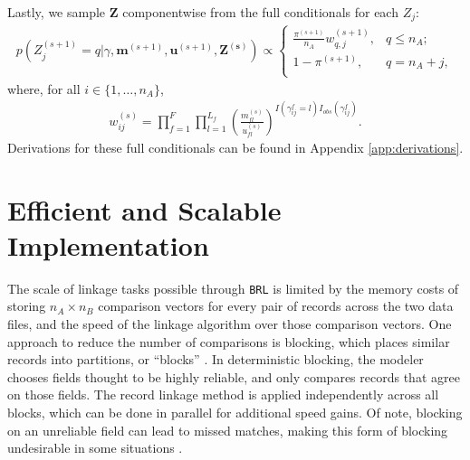 \documentclass[ba]{imsart}
\begin{document}
Lastly, we sample $\bm{Z}$ componentwise from the full conditionals for each $Z_j$:
\begin{align}
	\label{eqn:z_full_conditional}
	p\left(Z_j^{(s+1)}  = q|\gamma, \bm{m}^{(s+1)}, \bm{u}^{(s+1)}, \bm{Z^{(s)}}\right) \propto
	\begin{cases} 
		\frac{\pi^{(s+1)}}{n_A} w_{q, j}^{(s+1)},  & q \leq n_A; \\
		1 - \pi^{(s+1)}, & q  = n_A + j, \\
	\end{cases}
\end{align}
where, for all $i \in \{1, \ldots, n_A\}$, 
\begin{align}
	\label{eqn:fs_weight}
	w_{ij}^{(s)} = \prod_{f=1}^{F}\prod_{l = 1}^{L_f} \left(\frac{m_{fl}^{(s)}}{u_{fl}^{(s)}}\right)^{I(\gamma_{ij}^f = l)I_{obs}(\gamma_{ij}^f)}.
\end{align}
Derivations for these full conditionals can be found in Appendix \ref{app:derivations}.

\section{Efficient and Scalable Implementation}
\label{sec:efficiency}

The scale of linkage tasks possible through \texttt{BRL} is limited by the memory costs of storing $n_A \times n_B$ comparison vectors for every pair of records across the two data files, and the speed of the linkage algorithm over those comparison vectors. One approach to reduce the number of comparisons is blocking, which places similar records into partitions, or ``blocks'' \citep{christen2019data}. In deterministic blocking, the modeler chooses fields thought to be highly reliable, and only compares records that agree on those fields. The record linkage method is  applied independently across all blocks, which can be done in parallel for additional speed gains. Of note, blocking on an unreliable field can lead to missed matches, making this form of blocking undesirable in some situations \citep{steorts_comparison_2014}.
\end{document}
